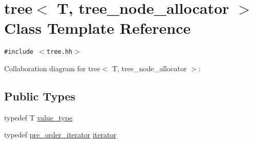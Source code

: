 \hypertarget{classtree}{
\section{tree$<$ T, tree\_\-node\_\-allocator $>$ Class Template Reference}
\label{classtree}
}
{\tt \#include $<$tree.hh$>$}

Collaboration diagram for tree$<$ T, tree\_\-node\_\-allocator $>$:\subsection*{Public Types}
\begin{CompactItemize}
\item 
typedef T \hyperlink{classtree_1e7bcd21e7420f7922a1bca79080acfa}{value\_\-type}
\item 
typedef \hyperlink{classtree_1_1pre__order__iterator}{pre\_\-order\_\-iterator} \hyperlink{classtree_2079982538b88d21fe1ccea34fe7ce0e}{iterator}
\end{CompactItemize}
